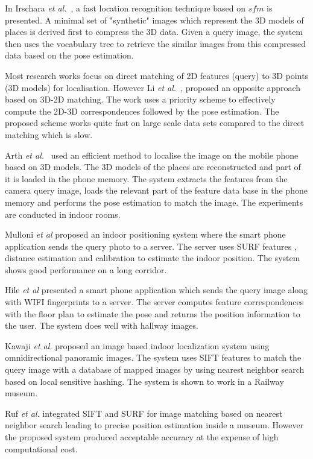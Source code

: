 In Irschara \emph{et al.}~\cite{irschara09}, 
a fast location recognition technique 
based on $sfm$  is presented. A minimal set of "synthetic" 
images which represent the 3D models of places is 
derived first to compress the 3D data. Given a query image, 
the system then uses the vocabulary tree to retrieve 
the similar images from this compressed data 
based on the pose estimation. 

Most research works focus on direct matching of
2D features (query) to 3D points (3D models) 
for localisation. However Li  \emph{et al.}~\cite{li10},
proposed an opposite approach based on 
3D-2D matching. The work uses a priority scheme 
to effectively compute the 2D-3D correspondences 
followed by the pose estimation. The proposed scheme works quite fast
on large scale data sets compared to the direct matching which is 
slow. 


Arth \emph{et al.}~\cite{arth2009}
used an efficient method to localise
the image on the mobile phone 
based on 3D models. The 
3D models of the places are 
reconstructed and part of it is loaded in the phone memory. 
The system extracts the features from the 
camera query image, loads the relevant part of 
the feature data base in the phone memory and performs 
the pose estimation to match the image. 
The experiments are conducted in indoor 
rooms.

Mulloni \emph{et al} \cite{mulloni09} proposed an indoor 
positioning system where the smart phone 
application sends the query photo to a server. 
The server uses SURF features \cite{bay06}, 
distance estimation and calibration 
to estimate the indoor position.
The system shows good performance 
on a long corridor. 

Hile \emph{et al} \cite{hile07} 
presented a smart phone application 
which sends the query image along 
with WIFI fingerprints to a server. 
The server computes feature correspondences 
with the floor plan to estimate the pose
and returns the position information to the 
user. The system does well with hallway images.


Kawaji \emph{et al.} \cite{kawaji10} proposed an image 
based indoor localization system using omnidirectional 
panoramic images. The system uses SIFT features \cite{lowe04} 
to match the query image with a database 
of mapped images by using nearest neighbor search 
based on local sensitive hashing. The system 
is shown to work in a Railway museum.


Ruf \emph{et al.} \cite{ruf08} integrated 
SIFT and SURF for image matching 
based on nearest neighbor search 
leading to precise position estimation inside 
a museum. However the proposed system 
produced acceptable accuracy at the expense of high computational
cost.


